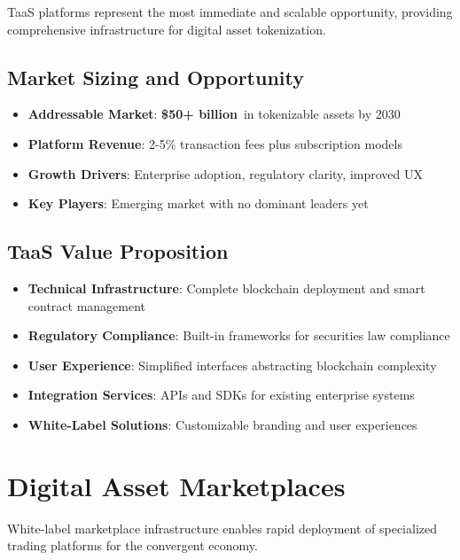 \documentclass[11pt,a4paper]{report}
\newcommand{\marketvalue}[2]{\textcolor{trust}{\textbf{\$#1}}\,\textcolor{darkgray}{#2}}
\begin{document}
TaaS platforms represent the most immediate and scalable opportunity, providing comprehensive infrastructure for digital asset tokenization.

\subsection{Market Sizing and Opportunity}

\begin{marketfigure}
\begin{itemize}
    \item \textbf{Addressable Market}: \marketvalue{50+ billion}{} in tokenizable assets by 2030
    \item \textbf{Platform Revenue}: 2-5\% transaction fees plus subscription models
    \item \textbf{Growth Drivers}: Enterprise adoption, regulatory clarity, improved UX
    \item \textbf{Key Players}: Emerging market with no dominant leaders yet
\end{itemize}
\end{marketfigure}

\subsection{TaaS Value Proposition}

\begin{itemize}
    \item \textbf{Technical Infrastructure}: Complete blockchain deployment and smart contract management
    \item \textbf{Regulatory Compliance}: Built-in frameworks for securities law compliance
    \item \textbf{User Experience}: Simplified interfaces abstracting blockchain complexity
    \item \textbf{Integration Services}: APIs and SDKs for existing enterprise systems
    \item \textbf{White-Label Solutions}: Customizable branding and user experiences
\end{itemize}

\section{Digital Asset Marketplaces}

White-label marketplace infrastructure enables rapid deployment of specialized trading platforms for the convergent economy.
\end{document}
